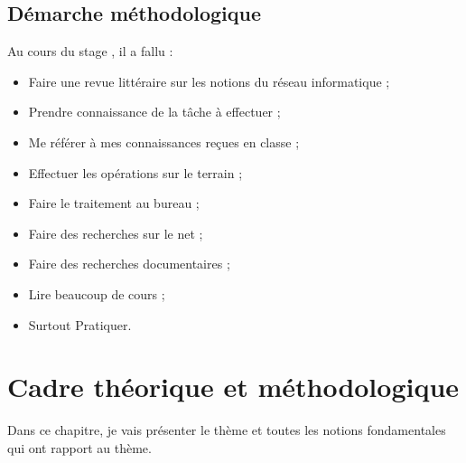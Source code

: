 \documentclass[a4paper,12pt,french]{report} %
\begin{document}
\section{Démarche méthodologique}
	Au cours du stage , il a fallu :
	\begin{itemize}
		\item Faire une revue littéraire sur les notions du réseau informatique ;
		\item  Prendre connaissance de la tâche à effectuer ;
		\item Me référer à mes connaissances reçues en classe ;
		\item Effectuer les opérations sur le terrain ;
		\item Faire le traitement au bureau ;
		\item Faire des recherches sur le net  ;
		\item Faire des recherches documentaires ;
		\item Lire beaucoup de cours ;
		\item Surtout Pratiquer.
	\end{itemize}
			
\chapter{Cadre théorique et méthodologique}
	Dans ce chapitre, je vais présenter le thème et toutes les notions fondamentales qui ont rapport au thème.
	
\end{document}
